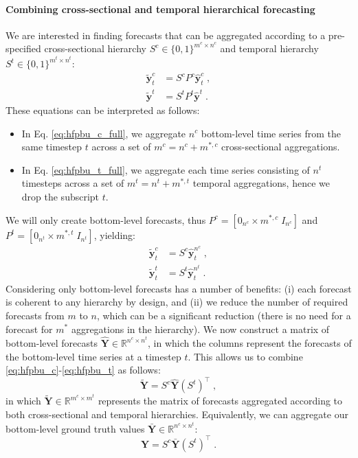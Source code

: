 \documentclass[preprint, 3p, times, twocolumn]{elsarticle}
\begin{document}
\paragraph{Combining cross-sectional and temporal hierarchical forecasting} We are interested in finding forecasts that can be aggregated according to a pre-specified cross-sectional hierarchy \(S^c \in \{0, 1\}^{m^c \times n^c}\) and temporal hierarchy \(S^t \in \{0, 1\}^{m^t \times n^t}\):
\begin{align} 
  \tilde{\textbf{y}}^c_{t} &= S^c P^c \hat{\textbf{y}}^c_{t} \;, \label{eq:hfpbu_c_full} \\
  \tilde{\textbf{y}}^t &= S^t P^t \hat{\textbf{y}}^t \;. \label{eq:hfpbu_t_full}
\end{align}
These equations can be interpreted as follows:
\begin{itemize}
  \item In Eq. \eqref{eq:hfpbu_c_full}, we aggregate \(n^c\) bottom-level time series from the same timestep \(t\) across a set of \(m^c = n^c + m^{*, c}\) cross-sectional aggregations.
  \item In Eq. \eqref{eq:hfpbu_t_full}, we aggregate each time series consisting of \(n^t\) timesteps across a set of \(m^t = n^t + m^{*, t}\) temporal aggregations, hence we drop the subscript \(t\).
\end{itemize}
We will only create bottom-level forecasts, thus \(P^c = [0_{n^c} \times m^{*, c} \; I_{n^c}] \) and \(P^t = [0_{n^t} \times m^{*, t} \; I_{n^t}] \), yielding:
\begin{align} 
  \tilde{\textbf{y}}^c_{t} &= S^c \hat{\textbf{y}}^{n^c}_{t} \;, \label{eq:hfpbu_c} \\
  \tilde{\textbf{y}}^t_{t} &= S^t \hat{\textbf{y}}^{n^t}_{t} \;. \label{eq:hfpbu_t}
\end{align}
Considering only bottom-level forecasts has a number of benefits: (i) each forecast is coherent to any hierarchy by design, and (ii) we reduce the number of required forecasts from \(m\) to \(n\), which can be a significant reduction (there is no need for a forecast for \(m^*\) aggregations in the hierarchy). 
We now construct a matrix of bottom-level forecasts \(\hat{\textbf{Y}} \in \mathbb{R}^{n^c \times n^t}\), in which the columns represent the forecasts of the bottom-level time series at a timestep \(t\). This allows us to combine \eqref{eq:hfpbu_c}-\eqref{eq:hfpbu_t} as follows:
\begin{equation}
  \tilde{\textbf{Y}} = S^c \hat{\textbf{Y}} (S^t)^\intercal \;, \label{eq:hfp_tc} 
\end{equation}
in which \(\tilde{\textbf{Y}} \in \mathbb{R}^{m^c \times m^t}\) represents the matrix of forecasts aggregated according to both cross-sectional and temporal hierarchies. Equivalently, we can aggregate our bottom-level ground truth values \(\bar{\textbf{Y}} \in \mathbb{R}^{n^c \times n^t}\):
\begin{equation}
  \textbf{Y} = S^c \bar{\textbf{Y}} (S^t)^\intercal \;.
\end{equation}
\end{document}
